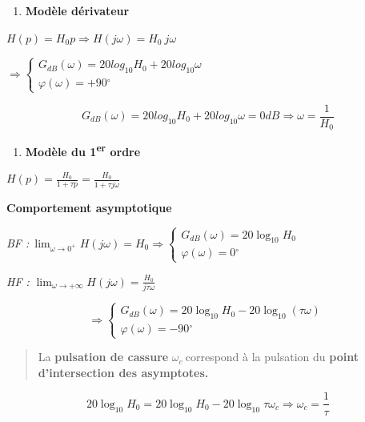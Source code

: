 \begin{enumerate}
\def\labelenumi{\arabic{enumi}.}
\setcounter{enumi}{3}
\item
  \textbf{Modèle dérivateur}
\end{enumerate}

\(H(p) = H_{0}p \Longrightarrow H(j\omega) = H_{0}\ j\omega\)

\(\Rightarrow \left\{ \begin{array}{r}
G_{dB}(\omega) = 20{log_{10}}{H_{0} + 20{log_{10}}\omega} \\
\varphi(\omega) = + 90{^\circ}
\end{array} \right.\ \)

\[G_{dB}(\omega) = 20{log_{10}}H_{0} + 20{log_{10}}\omega = 0dB \Longrightarrow \omega = \frac{1}{H_{0}}\]

\begin{enumerate}
\def\labelenumi{\arabic{enumi}.}
\setcounter{enumi}{4}
\item
  \protect\hypertarget{mod-_Toc99121126}{}{}\textbf{Modèle du 1\textsuperscript{er} ordre}
\end{enumerate}

\(H(p) = \frac{H_{0}}{1 + \tau p} = \frac{H_{0}}{1 + \tau j\omega}\)

\textbf{Comportement asymptotique}

\emph{BF :}\(\ \lim_{\omega \rightarrow 0^{+}}{H(j\omega)} = H_{0} \Longrightarrow \left\{ \begin{array}{r}
G_{dB}(\omega) = 20\log_{10}H_{0} \\
\varphi(\omega) = 0{^\circ}
\end{array} \right.\ \)

\emph{HF :} \(\lim_{\omega \rightarrow + \infty}{H(j\omega)} = \frac{H_{0}}{j\tau\omega}\)

\[\Longrightarrow \left\{ \begin{array}{r}
G_{dB}(\omega) = 20\log_{10}H_{0} - 20\log_{10}(\tau\omega) \\
\varphi(\omega) = - 90{^\circ}
\end{array} \right.\ \]

\begin{quote}
La \textbf{pulsation de cassure} \(\omega_{c}\ \)correspond à la pulsation du \textbf{point} \textbf{d'intersection des asymptotes.}
\end{quote}

\[20\log_{10}H_{0} = 20\log_{10}H_{0} - 20\log_{10}{\tau\omega_{c}} \Longrightarrow \omega_{c} = \frac{1}{\tau}\]

